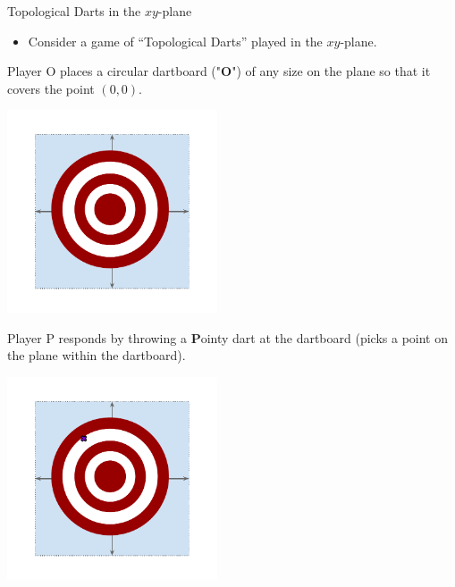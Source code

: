\documentclass{beamer}
\begin{document}
\begin{frame}{Topological Darts in the $xy$-plane}
  \begin{itemize}
    \item
      Consider a game of ``Topological Darts'' played in the $xy$-plane.
  \end{itemize}
\end{frame}
\begin{frame}
  Player O places a circular dartboard ("\textbf{O}") of any size on the plane so that it covers the point $(0,0)$.
  \begin{center}
    \includegraphics[height=6cm]{images/topdarts_plane_o0}
  \end{center}
\end{frame}
\begin{frame}
  Player P responds by throwing a \textbf{P}ointy dart at the dartboard (picks a point on the plane within the dartboard).
  \begin{center}
    \includegraphics[height=6cm]{images/topdarts_plane_p0}
  \end{center}
\end{frame}
\end{document}
